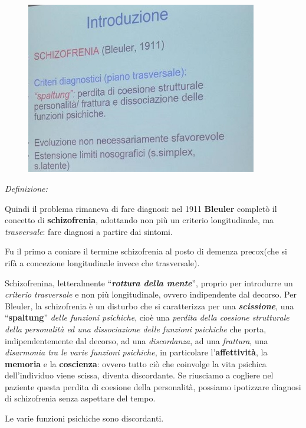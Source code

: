 \begin{figure}[!ht]
\centering
	\includegraphics[width=0.9\textwidth]{06/image1.jpeg}
\end{figure}

\emph{\emph{Definizione:}}

Quindi il problema rimaneva di fare diagnosi: nel 1911 \textbf{Bleuler}
completò il concetto di \textbf{schizofrenia}, adottando non più un
criterio longitudinale, ma \emph{trasversale}: fare diagnosi a partire
dai sintomi.

Fu il primo a coniare il termine schizofrenia al posto di demenza
precox(che si rifà a concezione longitudinale invece che trasversale).

Schizofrenina, letteralmente ``\textbf{\emph{rottura della mente}}'',
proprio per introdurre un \emph{criterio trasversale} e non più
longitudinale, ovvero indipendente dal decorso. Per Bleuler, la
schizofrenia è un disturbo che si caratterizza per una
\textbf{\emph{scissione}}, una ``\textbf{spaltung}'' \emph{delle
funzioni psichiche}, cioè una \emph{perdita della coesione strutturale
della personalità ed una dissociazione delle funzioni psichiche} che
porta, indipendentemente dal decorso, ad una \emph{discordanza}, ad una
\emph{frattura}, una \emph{disarmonia tra le varie funzioni psichiche},
in particolare l'\textbf{affettività}, la \textbf{memoria} e la
\textbf{coscienza}: ovvero tutto ciò che coinvolge la vita psichica
dell'individuo viene scissa, diventa discordante. Se riusciamo a
cogliere nel paziente questa perdita di coesione della personalità,
possiamo ipotizzare diagnosi di schizofrenia senza aspettare del tempo.

Le varie funzioni psichiche sono discordanti.

